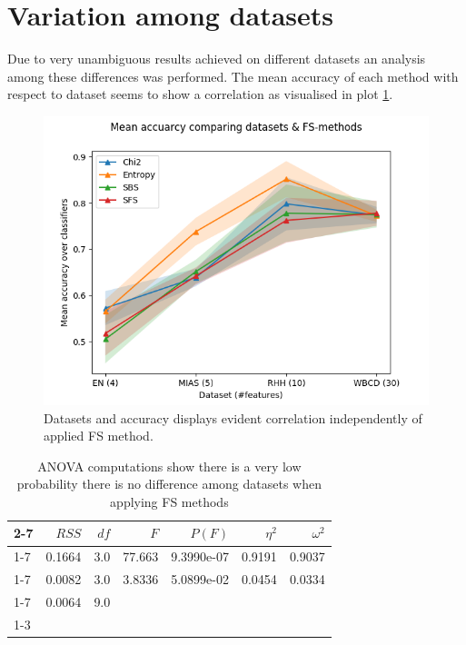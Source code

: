 \section{Variation among datasets}

Due to very unambiguous results achieved on different datasets an analysis among these differences was performed. The mean accuracy of each method with respect to dataset seems to show a correlation as visualised in plot \ref{fig:comp_acc_datasets}.

\begin{figure}[ht!]
  \centering
  \includegraphics[width=0.7\linewidth]{../plots_with_std_fill/comp_acc_datasets.png}
  \caption{Datasets and accuracy displays evident correlation independently of applied FS method.}
  \label{fig:comp_acc_datasets}
\end{figure}


\begin{table}[ht]
  \begin{center}
  \begin{tabular}{l|r|r|r|r|r|r|}
  \cline{2-7}
  & $RSS$ & $df$ & $F$ & $P(F)$ & $\eta^2$ & $\omega^2$ \\ \cline{1-7}
  \multicolumn{1}{ |l| }{\textbf{Dataset}}
  & 0.1664 &  3.0 & 77.663 & 9.3990e-07 & 0.9191 & 0.9037 \\ \cline{1-7}
  \multicolumn{1}{ |l| }{\textbf{Method}}
  & 0.0082 &  3.0 & 3.8336 & 5.0899e-02 & 0.0454 & 0.0334 \\ \cline{1-7}
  \multicolumn{1}{ |l| }{\textbf{Residual}}
  & 0.0064 &  9.0 \\ \cline{1-3}
  \end{tabular}
  \caption{ANOVA computations show there is a very low probability there is no difference among datasets when applying FS methods}
  \label{table:anova_values}
  \end{center}
\end{table}

